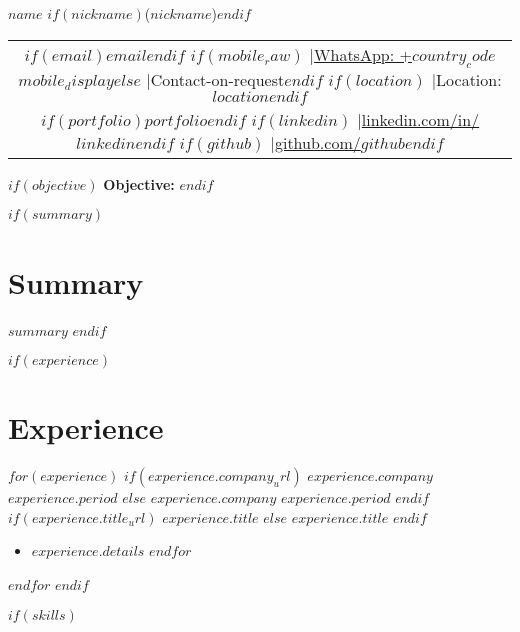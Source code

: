 \documentclass[10.5pt,a4paper]{article}
\newcommand{\daterange}[1]{\textbf{#1}}
\newcommand{\entryHeader}[2]{\noindent\textbf{#1} \hfill \daterange{#2}}
\newcommand{\entryHeaderLinked}[3]{\noindent\textbf{\href{#1}{#2}} \hfill \daterange{#3}}
\newcommand{\entrySubHeader}[1]{\textit{#1}}
\newcommand{\entrySubHeaderLinked}[2]{\textit{\href{#1}{#2}}}
\newenvironment{entryDetails}
  {%
    \begin{itemize}[leftmargin=2.5em, rightmargin=2.5em, itemsep=1pt, topsep=1pt, parsep=0pt]
  }
  {%
    \end{itemize}
    \vspace{-0.1cm}
  }
\begin{document}

\begin{center}
	{\Huge \textbf{\helveticabold $name$} $if(nickname)$(\helveticabold $nickname$)$endif$} \\
	\vspace{4pt}
	\begin{tabular}{@{}c@{}}
		$if(email)$\href{mailto:$email$}{$email$}$endif$
		$if(mobile_raw)$ \quad|\quad \href{https://wa.me/$country_code$$mobile_raw$}{WhatsApp: +$country_code$ $mobile_display$}$else$ \quad|\quad Contact-on-request$endif$
		$if(location)$ \quad|\quad Location: $location$$endif$                                                \\[2pt]
		$if(portfolio)$\href{https://$portfolio$?utm_source=resume & utm_medium=document}{$portfolio$}$endif$
		$if(linkedin)$ \quad|\quad \href{https://www.linkedin.com/in/$linkedin$}{linkedin.com/in/$linkedin$}$endif$
		$if(github)$ \quad|\quad \href{https://github.com/$github$}{github.com/$github$}$endif$
	\end{tabular}
\end{center}

$if(objective)$
{\large\bfseries\color{sectioncolor}Objective:} 
\vspace{5pt}
$endif$

$if(summary)$
\section*{Summary}
$summary$
$endif$

$if(experience)$
\section*{Experience}
$for(experience)$
$if(experience.company_url)$
\entryHeaderLinked{$experience.company_url$}{$experience.company$}{$experience.period$}
$else$
\entryHeader{$experience.company$}{$experience.period$}
$endif$
\\
$if(experience.title_url)$
\entrySubHeaderLinked{$experience.title_url$}{$experience.title$}
$else$
\entrySubHeader{$experience.title$}
$endif$
\begin{entryDetails}
	$for(experience.details)$
	\item $experience.details$
	$endfor$
\end{entryDetails}
$endfor$
$endif$

$if(skills)$
\end{document}
